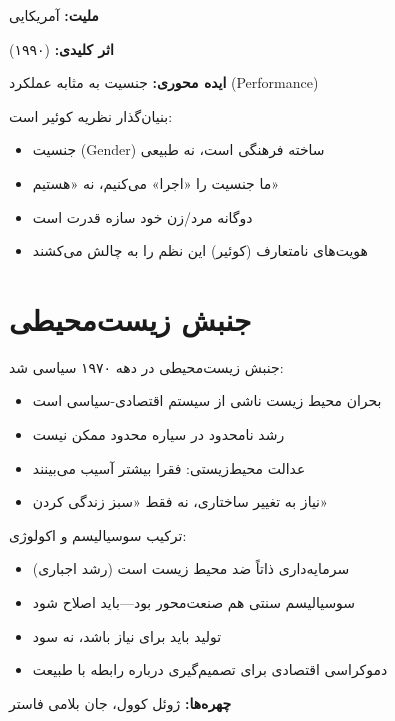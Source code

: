 \begin{personbox}

\textbf{ملیت:} آمریکایی

\textbf{اثر کلیدی:}  (۱۹۹۰)

\textbf{ایده محوری:} جنسیت به مثابه عملکرد (Performance)

\mediumspace

 بنیان‌گذار نظریه کوئیر است:
\begin{itemize}[nosep]
    \item جنسیت (Gender) ساخته فرهنگی است، نه طبیعی
    \item ما جنسیت را «اجرا» می‌کنیم، نه «هستیم»
    \item دوگانه مرد/زن خود سازه قدرت است
    \item هویت‌های نامتعارف (کوئیر) این نظم را به چالش می‌کشند
\end{itemize}
\end{personbox}

\section{جنبش زیست‌محیطی}

\begin{defbox}
جنبش زیست‌محیطی در دهه ۱۹۷۰ سیاسی شد:
\begin{itemize}[nosep]
    \item بحران محیط زیست ناشی از سیستم اقتصادی-سیاسی است
    \item رشد نامحدود در سیاره محدود ممکن نیست
    \item عدالت محیط‌زیستی: فقرا بیشتر آسیب می‌بینند
    \item نیاز به تغییر ساختاری، نه فقط «سبز زندگی کردن»
\end{itemize}
\end{defbox}

\begin{defbox}
ترکیب سوسیالیسم و اکولوژی:
\begin{itemize}[nosep]
    \item سرمایه‌داری ذاتاً ضد محیط زیست است (رشد اجباری)
    \item سوسیالیسم سنتی هم صنعت‌محور بود—باید اصلاح شود
    \item تولید باید برای نیاز باشد، نه سود
    \item دموکراسی اقتصادی برای تصمیم‌گیری درباره رابطه با طبیعت
\end{itemize}
\textbf{چهره‌ها:} ژوئل کوول، جان بلامی فاستر
\end{defbox}

